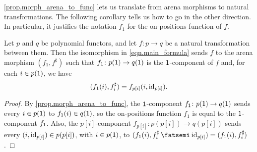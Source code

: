 \documentclass[Book-Poly]{subfiles}
\begin{document}




\cref{prop.morph_arena_to_func} lets us translate from arena morphisms to natural transformations.
The following corollary tells us how to go in the other direction.
In particular, it justifies the notation $f_1$ for the on-positions function of $f$.

\begin{corollary} \label{prop.morph_func_to_arena}
Let $p$ and $q$ be polynomial functors, and let $f \colon p \to q$ be a natural transformation between them.
Then the isomorphism in \eqref{eqn.main_formula} sends $f$ to the arena morphism $(f_1, f^\sharp)$ such that $f_1 \colon p(\textsf{1}) \to q(\textsf{1})$ is the $\textsf{1}$-component of $f$ and, for each $i \in p(\textsf{1})$, we have
\[
    (f_1(i), f^\sharp_i) = f_{p[i]}(i, \mathrm{id}_{p[i]}).
\]
\end{corollary}
\begin{proof}
By \cref{prop.morph_arena_to_func}, the $\textsf{1}$-component $f_{\textsf{1}} \colon p(\textsf{1}) \to q(\textsf{1})$ sends every $i \in p(\textsf{1})$ to $f_1(i) \in q(\textsf{1})$, so the on-positions function $f_1$ is equal to the $\textsf{1}$-component $f_{\textsf{1}}$.
Also, the $p[i]$-component $f_{p[i]} \colon p(p[i]) \to q(p[i])$ sends every $(i, \mathrm{id}_{p[i]}) \in p(p[i])$, with $i \in p(\textsf{1})$, to $(f_1(i), f^\sharp_i \then \id_{p[i]}) = (f_1(i), f^\sharp_i)$.
\end{proof}
\end{document}
